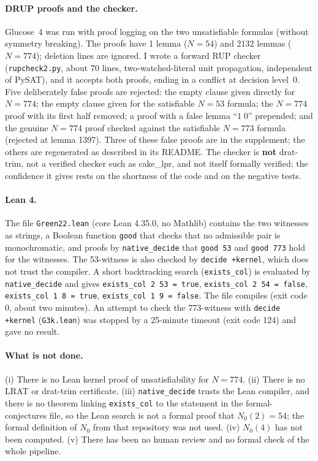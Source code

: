 \documentclass[11pt]{article}
\begin{document}
\paragraph{DRUP proofs and the checker.} Glucose~4 was run with proof logging on the two unsatisfiable formulas (without symmetry breaking). The proofs have 1 lemma ($N=54$) and 2132 lemmas ($N=774$); deletion lines are ignored. I wrote a forward RUP checker (\texttt{rupcheck2.py}, about 70 lines, two-watched-literal unit propagation, independent of PySAT), and it accepts both proofs, ending in a conflict at decision level~0. Five deliberately false proofs are rejected: the empty clause given directly for $N=774$; the empty clause given for the satisfiable $N=53$ formula; the $N=774$ proof with its first half removed; a proof with a false lemma ``$1\;0$'' prepended; and the genuine $N=774$ proof checked against the satisfiable $N=773$ formula (rejected at lemma 1397). Three of these false proofs are in the supplement; the others are regenerated as described in its README. The checker is \textbf{not} drat-trim, not a verified checker such as cake\_lpr, and not itself formally verified; the confidence it gives rests on the shortness of the code and on the negative tests.

\paragraph{Lean 4.} The file \texttt{Green22.lean} (core Lean 4.35.0, no Mathlib) contains the two witnesses as strings, a Boolean function \texttt{good} that checks that no admissible pair is monochromatic, and proofs by \texttt{native\_decide} that \texttt{good 53} and \texttt{good 773} hold for the witnesses. The 53-witness is also checked by \texttt{decide +kernel}, which does not trust the compiler. A short backtracking search (\texttt{exists\_col}) is evaluated by \texttt{native\_decide} and gives \texttt{exists\_col 2 53 = true}, \texttt{exists\_col 2 54 = false}, \texttt{exists\_col 1 8 = true}, \texttt{exists\_col 1 9 = false}. The file compiles (exit code 0, about two minutes). An attempt to check the 773-witness with \texttt{decide +kernel} (\texttt{G3k.lean}) was stopped by a 25-minute timeout (exit code 124) and gave no result.

\paragraph{What is not done.} (i) There is no Lean kernel proof of unsatisfiability for $N=774$. (ii) There is no LRAT or drat-trim certificate. (iii) \texttt{native\_decide} trusts the Lean compiler, and there is no theorem linking \texttt{exists\_col} to the statement in the formal-conjectures file, so the Lean search is not a formal proof that $N_0(2)=54$; the formal definition of $N_0$ from that repository was not used. (iv) $N_0(4)$ has not been computed. (v) There has been no human review and no formal check of the whole pipeline.
\end{document}
